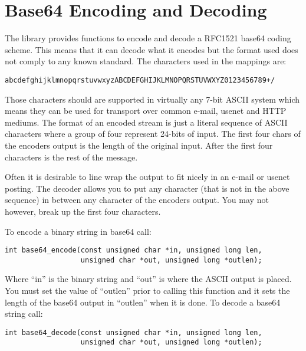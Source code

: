 \documentclass{book}
\begin{document}
\section{Base64 Encoding and Decoding}
The library provides functions to encode and decode a RFC1521 base64 coding scheme.  This means that it can decode what it 
encodes but the format used does not comply to any known standard.  The characters used in the mappings are:
\begin{verbatim}
abcdefghijklmnopqrstuvwxyzABCDEFGHIJKLMNOPQRSTUVWXYZ0123456789+/
\end{verbatim}
Those characters should are supported in virtually any 7-bit ASCII system which means they can be used for transport over
common e-mail, usenet and HTTP mediums.  The format of an encoded stream is just a literal sequence of ASCII characters
where a group of four represent 24-bits of input.  The first four chars of the encoders output is the length of the 
original input.  After the first four characters is the rest of the message.

Often it is desirable to line wrap the output to fit nicely in an e-mail or usenet posting.  The decoder allows you to
put any character (that is not in the above sequence) in between any character of the encoders output.  You may not however,
break up the first four characters.

To encode a binary string in base64 call:
   
\begin{verbatim}
int base64_encode(const unsigned char *in, unsigned long len, 
                  unsigned char *out, unsigned long *outlen);
\end{verbatim}
Where ``in'' is the binary string and ``out'' is where the ASCII output is placed.  You must set the value of ``outlen'' prior
to calling this function and it sets the length of the base64 output in ``outlen'' when it is done.  To decode a base64 
string call:
\begin{verbatim}
int base64_decode(const unsigned char *in, unsigned long len, 
                  unsigned char *out, unsigned long *outlen);
\end{verbatim}
\end{document}
